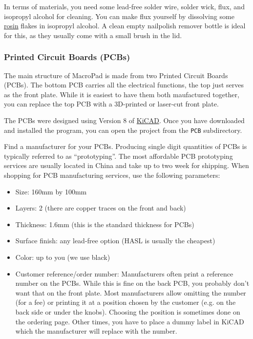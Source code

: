 \documentclass{article}
\newcommand{\file}[1]{\texttt{#1}}
\begin{document}
In terms of materials, you need some lead-free solder wire, solder wick, flux, and isopropyl alcohol for cleaning. You can make flux yourself by dissolving some \href{https://en.wikipedia.org/wiki/Rosin}{rosin} flakes in isopropyl alcohol. A clean empty nailpolish remover bottle is ideal for this, as they usually come with a small brush in the lid. 

\subsubsection{Printed Circuit Boards (PCBs)}
The main structure of MacroPad is made from two Printed Circuit Boards (PCBs). The bottom PCB carries all the electrical functions, the top just serves as the front plate. While it is easiest to have them both maufactured together, you can replace the top PCB with a 3D-printed or laser-cut front plate. 

The PCBs were designed using Version 8 of \href{https://www.kicad.org/}{KiCAD}. Once you have downloaded and installed the program, you can open the project from the \file{PCB} subdirectory. 

Find a manufacturer for your PCBs. Producing single digit quantities of PCBs is typically referred to as ``prototyping''. The most affordable PCB prototyping services are usually located in China and take up to two week for shipping. 
When shopping for PCB manufacturing services, use the following parameters:
\begin{itemize}
\item Size: 160mm by 100mm
\item Layers: 2 (there are copper traces on the front and back)
\item Thickness: 1.6mm (this is the standard thickness for PCBs)
\item Surface finish: any lead-free option (HASL is usually the cheapest)
\item Color: up to you (we use black)
\item Customer reference/order number: Manufacturers often print a reference number on the PCBs. While this is fine on the back PCB, you probably don't want that on the front plate. Most manufacturers allow omitting the number (for a fee) or printing it at a position chosen by the customer (e.g. on the back side or under the knobs). Choosing the position is sometimes done on the ordering page. Other times, you have to place a dummy label in KiCAD which the manufacturer will replace with the number. 
\end{itemize}
\end{document}
